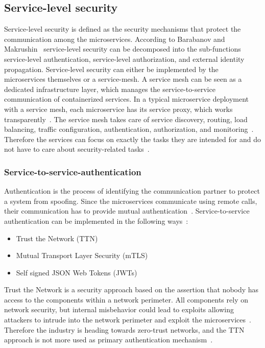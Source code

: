 \subsection{Service-level security}
Service-level security is defined as the security mechanisms that protect the communication among the microservices.
According to Barabanov and Makrushin~\cite{barabanov2020authentication} service-level security can be decomposed into the sub-functions service-level authentication, service-level authorization, and external identity propagation.
Service-level security can either be implemented by the microservices themselves or a service-mesh.
A service mesh can be seen as a dedicated infrastructure layer, which manages the service-to-service communication of containerized services.
In a typical microservice deployment with a service mesh, each microservice has its service proxy, which works transparently~\cite{dias2020microservices}.
The service mesh takes care of service discovery, routing, load balancing, traffic configuration, authentication, authorization, and monitoring~\cite{chandramouli2019microservices}.
Therefore the services can focus on exactly the tasks they are intended for and do not have to care about security-related tasks~\cite{dias2020microservices}.

\subsubsection{Service-to-service-authentication} 
\label{sec:service-to-service-authentication}
Authentication is the process of identifying the communication partner to protect a system from spoofing.
Since the microservices communicate using remote calls, their communication has to provide mutual authentication~\cite{dias2020microservices}.
Service-to-service authentication can be implemented in the following ways~\cite{dias2020microservices}:
\begin{itemize}
    \item Trust the Network (TTN)
    \item Mutual Transport Layer Security (mTLS)
    \item Self signed JSON Web Tokens (JWTs)
\end{itemize}
Trust the Network is a security approach based on the assertion that nobody has access to the components within a network perimeter.
All components rely on network security, but internal misbehavior could lead to exploits allowing attackers to intrude into the network perimeter and exploit the microservices~\cite{zaheer2019eztrust}. 
Therefore the industry is heading towards zero-trust networks, and the TTN approach is not more used as primary authentication mechanism~\cite{barabanov2020authentication}.


